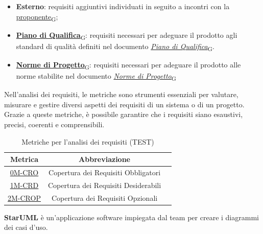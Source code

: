 \begin{enumerate}
\begin{itemize}
		      \item \textbf{Esterno}: requisiti aggiuntivi individuati in seguito a incontri con la \href{https://7last.github.io/docs/rtb/documentazione-interna/glossario\#proponente}{proponente\textsubscript{G}};
		      \item \href{https://7last.github.io/docs/rtb/documentazione-interna/glossario\#piano-di-qualifica}{\textbf{Piano di Qualifica}\textsubscript{G}}: requisiti necessari per adeguare il prodotto agli standard di qualità definiti nel documento \href{https://7last.github.io/docs/rtb/documentazione-interna/glossario\#piano-di-qualifica}{\textit{Piano di Qualifica}\textsubscript{G}}.
		      \item \href{https://7last.github.io/docs/rtb/documentazione-interna/glossario\#norme-di-progetto}{\textbf{Norme di Progetto}\textsubscript{G}}: requisiti necessari per adeguare il prodotto alle norme stabilite nel documento \href{https://7last.github.io/docs/rtb/documentazione-interna/glossario\#norme-di-progetto}{\textit{Norme di Progetto}\textsubscript{G}}
	      \end{itemize}
\end{enumerate}


Nell'analisi dei requisiti, le metriche sono strumenti essenziali per valutare, misurare e gestire diversi aspetti dei requisiti di un sistema o di un progetto. Grazie a queste metriche, è possibile garantire che i requisiti siano esaustivi, precisi, coerenti e comprensibili.
\\
\begin{table}[!h] %
	\centering
	\begin{tabular}{|c|c|c|}
		\hline
		\textbf{Metrica}                    & \textbf{Abbreviazione}               \\
		\hline
		\hyperlink{subsection.6.2}{0M-CRO}  & Copertura dei Requisiti Obbligatori  \\
		\hyperlink{subsection.6.2}{1M-CRD}  & Copertura dei Requisiti Desiderabili \\
		\hyperlink{subsection.6.2}{2M-CROP} & Copertura dei Requisiti Opzionali    \\
		\hline
	\end{tabular}
	\caption{Metriche per l'analisi dei requisiti (TEST)}
	\label{tab:2}
\end{table}

\textbf{StarUML} è un'applicazione software impiegata dal team per creare i diagrammi dei casi d'uso.


